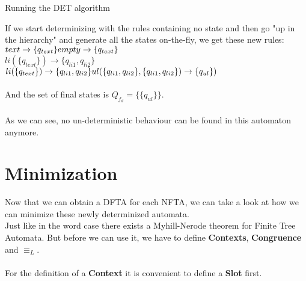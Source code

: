 \documentclass{llncs}
\begin{document}
\begin{example}{Running the DET algorithm}
\begin{center}
			\end{center}
					If we start determinizing with the rules containing no state and then go "up in the hierarchy" and generate all the states on-the-fly, we get these new rules:
					\\
					\(
					\\
					text \rightarrow \{q_{text}\}
					\\
					empty \rightarrow \{q_{text}\}\)
					\\
					\(li(\{q_{text}\}) \rightarrow \{q_{li1}, q_{li2}\}\)
					\newline
					\(li(\{q_{text}\}) \rightarrow \{q_{li1}, q_{li2}\}
					\\
					ul(\{q_{li1}, q_{li2}\}, \{q_{li1}, q_{li2}\}) \rightarrow \{q_{ul}\})
					\)
					\\
					\\
				    And the set of final states is \(Q_{f_d} = \{\{q_{ul}\}\}\).
				    \\
				    \\
				    As we can see, no un-deterministic behaviour can be found in this automaton anymore.
			\end{example}

\pagebreak

\chapter*{Minimization}

Now that we can obtain a DFTA for each NFTA, we can take a look at how we can minimize these newly determinized automata.
\\
Just like in the word case there exists a Myhill-Nerode theorem for Finite Tree Automata. But before we can use it, we have to define \textbf{Contexts}, \textbf{Congruence} and \(\equiv_L\).
\\\\
For the definition of a \textbf{Context} it is convenient to define a \textbf{Slot} first.
\end{document}
